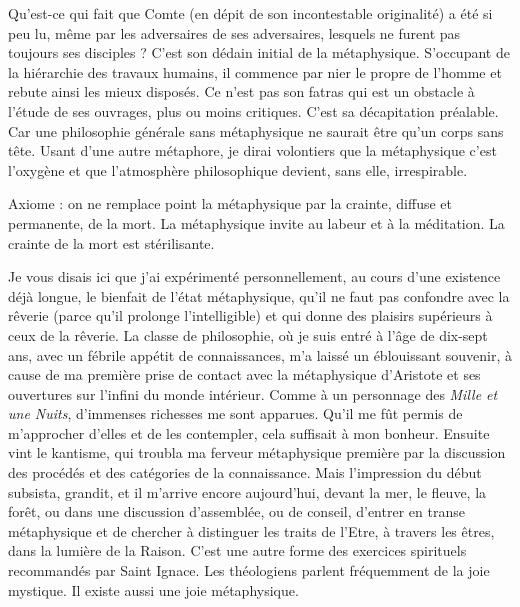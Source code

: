 \documentclass[french,twoside]{book} %
\begin{document}
Qu’est-ce qui fait que Comte (en dépit de son incontestable originalité) a été si peu lu, même par les adversaires de ses adversaires, lesquels ne furent pas toujours ses disciples ? C’est son dédain initial de la métaphysique. S’occupant de la hiérarchie des travaux humains, il commence par nier le propre de l’homme et rebute ainsi les mieux disposés. Ce n’est pas son fatras qui est un obstacle à l’étude de ses ouvrages, plus ou moins critiques. C’est sa décapitation préalable. Car une philosophie générale sans métaphysique ne saurait être qu’un corps sans tête. Usant d’une autre métaphore, je dirai volontiers que la métaphysique c’est l’oxygène et que l’atmosphère philosophique devient, sans elle, irrespirable.\par
Axiome : on ne remplace point la métaphysique par la crainte, diffuse et permanente, de la mort. La métaphysique invite au labeur et à la méditation. La crainte de la mort est stérilisante.\par
Je vous disais ici que j’ai expérimenté personnellement, au cours d’une existence déjà longue, le bienfait de l’état métaphysique, qu’il ne faut pas confondre avec la rêverie (parce qu’il prolonge l’intelligible) et qui donne des plaisirs supérieurs à ceux de la rêverie. La classe de philosophie, où je suis entré à l’âge de dix-sept ans, avec un fébrile appétit de connaissances, m’a laissé un éblouissant souvenir, à cause de ma première prise de contact avec la métaphysique d’Aristote et ses ouvertures sur l’infini du monde intérieur. Comme à un personnage des {\itshape Mille et une Nuits}, d’immenses richesses me sont apparues. Qu’il me fût permis de m’approcher d’elles et de les contempler, cela suffisait à mon bonheur. Ensuite vint le kantisme, qui troubla ma ferveur métaphysique première par la discussion des procédés et des catégories de la connaissance. Mais l’impression du début subsista, grandit, et il m’arrive encore aujourd’hui, devant la mer, le fleuve, la forêt, ou dans une discussion d’assemblée, ou de conseil, d’entrer en transe métaphysique et de chercher à distinguer les traits de l’Etre, à travers les êtres, dans la lumière de la Raison. C’est une autre forme des exercices spirituels recommandés par Saint Ignace. Les théologiens parlent fréquemment de la joie mystique. Il existe aussi une joie métaphysique.\par
\end{document}
